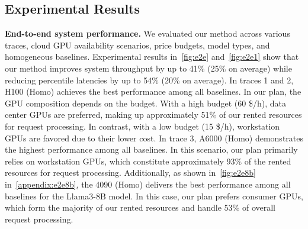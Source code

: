
\subsection{Experimental Results}
\label{sec:expr_results}

\textbf{End-to-end system performance.}
We evaluated our method across various traces, cloud GPU availability scenarios, price budgets, model types, and homogeneous baselines. Experimental results in~\autoref{fig:e2e} and~\autoref{fig:e2e1} show that our method improves system throughput by up to 41\% (25\% on average) while reducing percentile latencies by up to 54\% (20\% on average).
In traces 1 and 2, H100 (Homo) achieves the best performance among all baselines. In our plan, the GPU composition depends on the budget. With a high budget (60 \$/h), data center GPUs are preferred, making up approximately 51\% of our rented resources for request processing. In contrast, with a low budget (15 \$/h), workstation GPUs are favored due to their lower cost.
In trace 3, A6000 (Homo) demonstrates the highest performance among all baselines. In this scenario, our plan primarily relies on workstation GPUs, which constitute approximately 93\% of the rented resources for request processing.
Additionally, as shown in~\autoref{fig:e2e8b} in~\autoref{appendix:e2e8b}, the 4090 (Homo) delivers the best performance among all baselines for the Llama3-8B model. In this case, our plan prefers consumer GPUs, which form the majority of our rented resources and handle 53\% of overall request processing.



